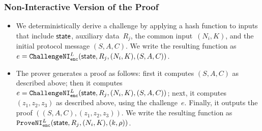 \documentclass[11pt]{article}
\newcommand{\jnote}[1]{{\textcolor{blue}{Jon's note: #1}}}
\newcommand{\dnote}[1]{{\textcolor{Orange}{Denis: #1}}}
\def\state{{\sf state}}
\newcommand{\sid}{\ensuremath{\mathtt{sid}}}
\newcommand{\commit}[1]{\ensuremath{\mathtt{Commit}_{\mathtt{#1}}}}
\newcommand{\challengeni}[1]{\ensuremath{\mathtt{ChallengeNI}_{\mathtt{#1}}}}
\newcommand{\proveni}[1]{\ensuremath{\mathtt{ProveNI}_{\mathtt{#1}}}}
\newcommand{\?}[1]{\stackrel{?}{#1}}
\begin{document}
\subsubsection{Non-Interactive Version of the Proof}

\begin{itemize}
    \item We deterministically derive a challenge by applying a hash function to inputs that include $\state$, auxiliary data~$R_j$, the common input~$(N_i, K)$, and the initial protocol message $(S, A, C)$.    
    We write the resulting function as 
    $e = \challengeni{enc}^{L}(\state, R_j, (N_i, K), (S, A, C))$.

    

    
    \item The prover generates a proof as follows: first it computes $(S, A, C)$ as described above; then it computes $e = \challengeni{enc}^{L}(\state, R_j, (N_i, K), (S, A, C))$; next, it computes $(z_1, z_2, z_3)$ as described above, using the challenge~$e$. Finally, it outputs the proof $((S, A, C), (z_1, z_2, z_3))$. We write the resulting function as $\proveni{enc}^{L}(\state, R_j, (N_i, K), (k, \rho))$.
    
        


\end{itemize}
\end{document}
